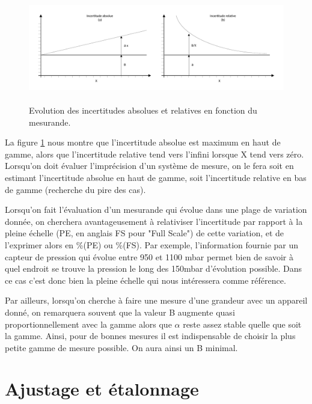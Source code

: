 \documentclass[main.tex]{subfiles}
\begin{document}
\begin{figure}[h]
    \centering
    \includegraphics[height=4.8cm]{assets/figures/incertitudes.pdf}
    \caption{Evolution des incertitudes absolues et relatives en fonction du mesurande.}
    \label{fig:incertitudes_abs_et_rel}
\end{figure}


La figure \ref{fig:incertitudes_abs_et_rel} nous montre que l'incertitude absolue est maximum en haut de gamme, alors que l'incertitude relative tend vers l'infini lorsque X tend vers zéro. Lorsqu'on doit évaluer l'imprécision d'un système de mesure, on le fera soit en estimant l'incertitude absolue en haut de gamme, soit l'incertitude relative en bas de gamme (recherche du pire des cas).

Lorsqu'on fait l'évaluation d'un mesurande qui évolue dans une plage de variation donnée, on cherchera avantageusement à relativiser l'incertitude par rapport à la pleine échelle (PE, en anglais FS pour "Full Scale") de cette variation, et de l'exprimer alors en \%(PE) ou \%(FS). Par exemple, l'information fournie par un capteur de pression qui évolue entre 950 et 1100 mbar permet bien de savoir à quel endroit se trouve la pression le long des 150mbar d'évolution possible. Dans ce cas c'est donc bien la pleine échelle qui nous intéressera comme référence.

Par ailleurs, lorsqu'on cherche à faire une mesure d'une grandeur avec un appareil donné, on remarquera souvent que la valeur B augmente quasi proportionnellement avec la gamme alors que $\alpha$ reste assez stable quelle que soit la gamme. Ainsi, pour de bonnes mesures il est indispensable de choisir la plus petite gamme de mesure possible. On aura ainsi un B minimal.

\section{Ajustage et étalonnage}
\end{document}
